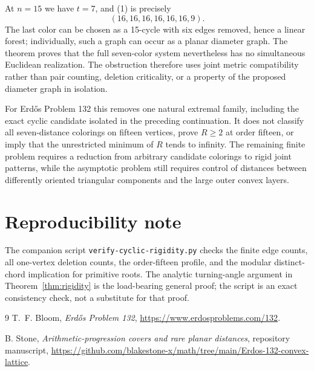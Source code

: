 \documentclass[11pt]{article}
\begin{document}
At $n=15$ we have $t=7$, and (1) is precisely
\[
 (16,16,16,16,16,16,9).
\]
The last color can be chosen as a 15-cycle with six edges removed, hence a
linear forest; individually, such a graph can occur as a planar diameter
graph.  The theorem proves that the full seven-color system nevertheless
has no simultaneous Euclidean realization.  The obstruction therefore uses
joint metric compatibility rather than pair counting, deletion criticality,
or a property of the proposed diameter graph in isolation.

For Erd\H{o}s Problem 132 this removes one natural extremal family, including
the exact cyclic candidate isolated in the preceding continuation.  It does
not classify all seven-distance colorings on fifteen vertices, prove
$R\ge2$ at order fifteen, or imply that the unrestricted minimum of $R$
tends to infinity.  The remaining finite problem requires a reduction from
arbitrary candidate colorings to rigid joint patterns, while the asymptotic
problem still requires control of distances between differently oriented
triangular components and the large outer convex layers.

\section*{Reproducibility note}

The companion script \texttt{verify-cyclic-rigidity.py} checks the finite
edge counts, all one-vertex deletion counts, the order-fifteen profile, and
the modular distinct-chord implication for primitive roots.  The analytic
turning-angle argument in Theorem~\ref{thm:rigidity} is the load-bearing
general proof; the script is an exact consistency check, not a substitute for
that proof.

\begin{thebibliography}{9}
T.~F. Bloom, \emph{Erd\H{o}s Problem 132},
\url{https://www.erdosproblems.com/132}.

B. Stone, \emph{Arithmetic-progression covers and rare planar distances},
repository manuscript,
\url{https://github.com/blakestone-x/math/tree/main/Erdos-132-convex-lattice}.
\end{thebibliography}
\end{document}
